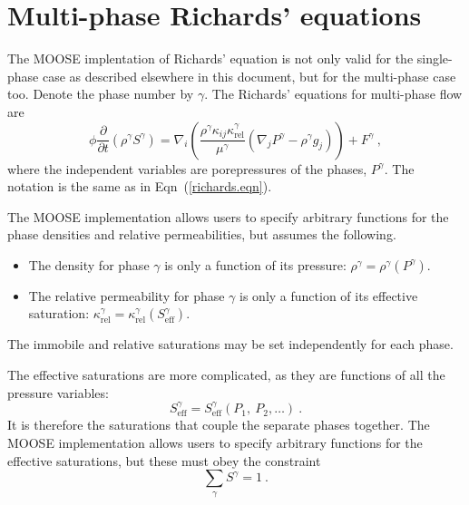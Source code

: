 \documentclass[]{scrreprt}
\begin{document}
\chapter{Multi-phase Richards' equations}
\label{chap.multi}

The MOOSE implentation of Richards' equation is not only valid for the
single-phase case as described elsewhere in this document, but for the
multi-phase case too.  Denote the phase number by $\gamma$.  The
Richards' equations for multi-phase flow are
\begin{equation}
\phi \frac{\partial}{\partial t} \left( \rho^{\gamma} S^{\gamma} \right) = \nabla_{i}
\left( \frac{\rho^{\gamma} \kappa_{ij}\kappa^{\gamma}_{\mathrm{rel}}}{\mu^{\gamma}} (\nabla_{j}P^{\gamma} - \rho^{\gamma}
g_{j}) \right) 
+ F^{\gamma} \ ,
\label{richards.eqn.multi}
\end{equation}
where the independent variables are porepressures of the phases, $P^{\gamma}$.
The notation is the same as in Eqn~(\ref{richards.eqn}).

The MOOSE
implementation allows users to specify arbitrary functions for the
phase densities and relative permeabilities, but assumes the following.
\begin{itemize}
\item The density for phase $\gamma$ is only a function of its
  pressure: $\rho^{\gamma} = \rho^{\gamma}(P^{\gamma})$.
\item The relative permeability for phase $\gamma$ is only a function
  of its effective saturation: $\kappa^{\gamma}_{\mathrm{rel}} =
  \kappa^{\gamma}_{\mathrm{rel}}(S^{\gamma}_{\mathrm{eff}})$.
\end{itemize}
The immobile and relative saturations may be set independently for
each phase.

The effective saturations are more complicated, as they are functions
of all the pressure variables:
\begin{equation}
S^{\gamma}_{\mathrm{eff}} =
S^{\gamma}_{\mathrm{eff}}(P_{1},\ P_{2},\ldots) \ .
\end{equation}
It is therefore the saturations that couple the separate phases
together.  The MOOSE implementation allows users to specify arbitrary
functions for the effective saturations, but these must obey the
constraint 
\begin{equation}
\sum_{\gamma}S^{\gamma} = 1 \ .
\end{equation}
\end{document}
